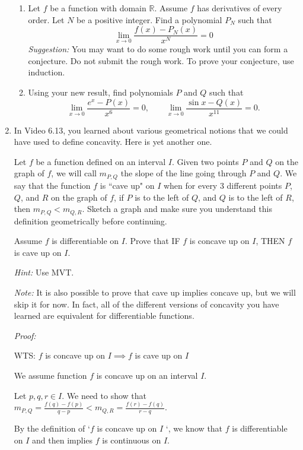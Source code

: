 \documentclass[12pt]{exam}
\newcommand {\DS} [1] {${\displaystyle #1}$}
\newcommand{\vv}{\vspace{.1cm}}
\newcommand{\R}{\mathbb{R}}
\begin{document}
\begin{enumerate}
\begin{enumerate}
			
		\item  Let $f$ be a function with domain $\R$.  Assume $f$ has derivatives of every order.   Let $N$ be a positive integer.  Find a polynomial \DS{P_N} such that
			$$
				\lim_{x \to 0} \frac{f(x) - P_N(x)}{x^N} = 0
			$$
			\emph{Suggestion:} You may want to do some rough work until you can form a conjecture.    Do not submit the rough work.  To prove your conjecture, use induction.
		\item  Using your new result, find polynomials $P$  and $Q$ such that
			$$
				\lim_{x \to 0} \frac{e^x - P(x)}{x^6} = 0, \quad \quad \lim_{x \to 0} \frac{\sin x - Q(x)}{x^{11}} = 0.
			$$
	\end{enumerate}

\vv

\item  In Video 6.13, you learned about various geometrical notions that we could have used to define concavity.  Here is yet another one.

 Let $f$ be a function defined on an interval $I$.  Given two points $P$ and $Q$ on the graph of $f$, we will call $m_{P,Q}$ the slope of the line going through $P$ and $Q$.  We say that the function $f$ is ``cave up" on $I$ when for every 3 different points $P$, $Q$, and $R$ on the graph of $f$, if $P$ is to the left of $Q$, and $Q$ is to the left of $R$, then $m_{P,Q} < m_{Q,R}$.  Sketch a graph and make sure you understand this definition geometrically  before continuing.
 
 Assume $f$ is differentiable on $I$. 
		Prove that IF $f$ is concave up on $I$, THEN $f$ is cave up on $I$.


\emph{Hint:}  Use MVT.

\emph{Note:}  It is also possible to prove that cave up implies concave up, but we will skip it for now.  In fact, all of the different versions of concavity you have learned are equivalent for differentiable functions.	

\vv

\emph{Proof:}

\vv

WTS: $f$ is concave up on $I \implies f$ is cave up on $I$

We assume function $f$ is concave up on an interval $I$.

Let $p,q,r\in I$. We need to show that $m_{P,Q}=\frac{f(q)-f(p)}{q-p}<m_{Q,R}=\frac{f(r)-f(q)}{r-q}$.

By the definition of `$f$ is concave up on $I$ `, we know that $f$ is differentiable on $I$ and then implies $f$ is continuous on $I$.


\end{enumerate}
\end{document}
